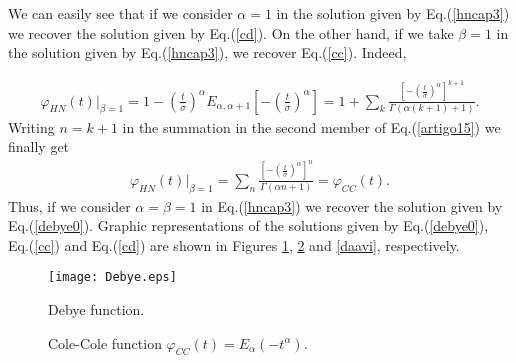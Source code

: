 \documentclass[12pt]{amsart}
\numberwithin{equation}{section}
\begin{document}
We can easily see that if we consider $\alpha =1$ in the solution given by 
Eq.(\ref{hncap3}) we recover the solution given by Eq.(\ref{cd}). On the
other hand, if we take  
$\beta=1$ in the solution given by Eq.(\ref{hncap3}), 
we recover Eq.(\ref{cc}). Indeed,

\begin{eqnarray}
\varphi_{HN}(t)|_{\beta=1}=1-\left(\frac{t}{\sigma}\right)^{\alpha}E_{\alpha,\alpha+1}\left[-\left(\frac{t}{\sigma}\right)^{\alpha}\right]=1+\sum_{k}\frac{\left[-\left(\frac{t}{\sigma}\right)^{\alpha}\right]^{k+1}}{\Gamma(\alpha(k+1)+1)}.
\label{artigo15}
\end{eqnarray}
Writing $n=k+1$ in the summation in the second member
of Eq.(\ref{artigo15}) we finally get
\begin{eqnarray}
\varphi_{HN}(t)|_{\beta=1}= \sum_{n}\frac{\left[-\left(\frac{t}{\sigma}\right)^{\alpha}\right]^{n}}{\Gamma(\alpha n+1)}=\varphi_{CC}(t).
\end{eqnarray}
Thus, if we consider $\alpha = \beta = 1$ in Eq.(\ref{hncap3}) we recover the
solution given by Eq.(\ref{debye0}).  Graphic representations of the solutions
given by Eq.(\ref{debye0}), Eq.(\ref{cc}) and Eq.(\ref{cd}) are shown in
Figures \ref{naovai}, \ref{coole} and \ref{daavi}, respectively. 

\begin{figure}[H]
\begin{center}
\texttt{[image: Debye.eps]}
\caption{Debye function.}
\label{naovai}
\end{center}
\end{figure}
\begin{figure}[H]
\qquad
{}
\caption{Cole-Cole function $\varphi_{CC}(t)=E_{\alpha}(-t^{\alpha})$.}
\label{coole}
\end{figure}
\end{document}
